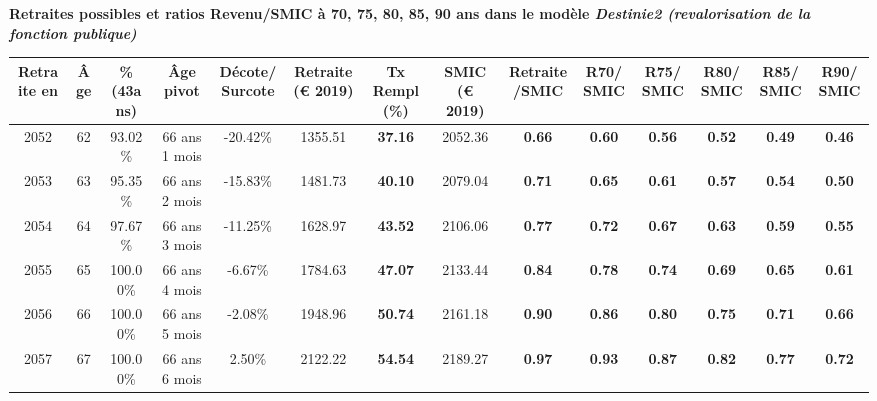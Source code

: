  \vspace{0.1cm} 
{\bf \noindent Retraites possibles et ratios Revenu/SMIC à 70, 75, 80, 85, 90 ans dans le modèle \emph{Destinie2 (revalorisation de la fonction publique)}}  
 
\begin{adjustbox}{max width=\textwidth} 
\begin{tabular}[htb]{|c|c||c|c|c||c|c||c|c||c|c|c|c|c|} 
\hline 
 Retraite en &  Âge &  \%(43ans) &  Âge pivot &  Décote/Surcote &  Retraite (\euro{} 2019) &  Tx Rempl(\%) &  SMIC (\euro{} 2019) &  Retraite/SMIC &  R70/SMIC &  R75/SMIC &  R80/SMIC &  R85/SMIC &  R90/SMIC \\ 
\hline \hline 
 2052 &  62 &  93.02\% &  66 ans 1 mois &  -20.42\% &  1355.51 &  {\bf 37.16} &  2052.36 &  {\bf {\color{red} 0.66}} &  {\bf {\color{red} 0.60}} &  {\bf {\color{red} 0.56}} &  {\bf {\color{red} 0.52}} &  {\bf {\color{red} 0.49}} &  {\bf {\color{red} 0.46}} \\ 
\hline 
 2053 &  63 &  95.35\% &  66 ans 2 mois &  -15.83\% &  1481.73 &  {\bf 40.10} &  2079.04 &  {\bf {\color{red} 0.71}} &  {\bf {\color{red} 0.65}} &  {\bf {\color{red} 0.61}} &  {\bf {\color{red} 0.57}} &  {\bf {\color{red} 0.54}} &  {\bf {\color{red} 0.50}} \\ 
\hline 
 2054 &  64 &  97.67\% &  66 ans 3 mois &  -11.25\% &  1628.97 &  {\bf 43.52} &  2106.06 &  {\bf {\color{red} 0.77}} &  {\bf {\color{red} 0.72}} &  {\bf {\color{red} 0.67}} &  {\bf {\color{red} 0.63}} &  {\bf {\color{red} 0.59}} &  {\bf {\color{red} 0.55}} \\ 
\hline 
 2055 &  65 &  100.00\% &  66 ans 4 mois &  -6.67\% &  1784.63 &  {\bf 47.07} &  2133.44 &  {\bf {\color{red} 0.84}} &  {\bf {\color{red} 0.78}} &  {\bf {\color{red} 0.74}} &  {\bf {\color{red} 0.69}} &  {\bf {\color{red} 0.65}} &  {\bf {\color{red} 0.61}} \\ 
\hline 
 2056 &  66 &  100.00\% &  66 ans 5 mois &  -2.08\% &  1948.96 &  {\bf 50.74} &  2161.18 &  {\bf {\color{red} 0.90}} &  {\bf {\color{red} 0.86}} &  {\bf {\color{red} 0.80}} &  {\bf {\color{red} 0.75}} &  {\bf {\color{red} 0.71}} &  {\bf {\color{red} 0.66}} \\ 
\hline 
 2057 &  67 &  100.00\% &  66 ans 6 mois &  2.50\% &  2122.22 &  {\bf 54.54} &  2189.27 &  {\bf {\color{red} 0.97}} &  {\bf {\color{red} 0.93}} &  {\bf {\color{red} 0.87}} &  {\bf {\color{red} 0.82}} &  {\bf {\color{red} 0.77}} &  {\bf {\color{red} 0.72}} \\ 
\hline 
\hline 
\end{tabular} 
\end{adjustbox} 
 
